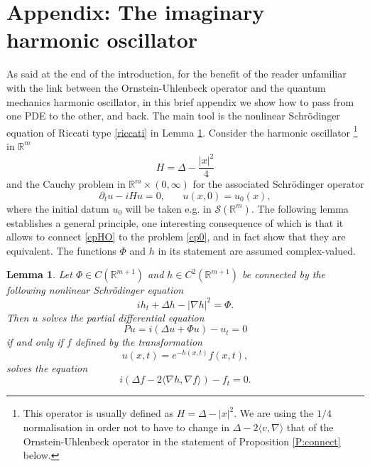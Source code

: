 \documentclass[11pt,a4paper]{amsart}
\def \R {\mathbb{R}}
\newcommand{\Rm}{\mathbb R^m}
\newcommand{\p}{\partial}
\numberwithin{equation}{section}
\newcommand{\sa}{\langle}
\newcommand{\da}{\rangle}
\newtheorem{lemma}[theorem]{Lemma}
\numberwithin{equation}{section}
\begin{document}
\section{Appendix: The imaginary harmonic oscillator}\label{S:app}

As said at the end of the introduction, for the benefit of the reader unfamiliar with the link between the Ornstein-Uhlenbeck operator and the quantum mechanics harmonic oscillator, in this brief appendix we show how to pass from one PDE to the other, and back. The main tool is the nonlinear Schr\"odinger equation of Riccati type \eqref{riccati} in Lemma \ref{L:ouho}. Consider the harmonic oscillator \footnote{This operator is usually defined as $H = \Delta - |x|^2$. We are using the $1/4$ normalisation in order not to have to change in $\Delta - 2 \sa v,\nabla\da$ that of the Ornstein-Uhlenbeck operator in the statement of Proposition \ref{P:connect} below.}  in $\Rm$
\begin{equation}\label{H}
H = \Delta - \frac{|x|^2}4
\end{equation}
and the Cauchy problem in $\Rm\times (0,\infty)$ for the associated Schr\"odinger operator
\begin{equation}\label{cpHO}
\p_t u - i H u = 0,\ \ \ \ \ \ \ \ u(x,0) = u_0(x),
\end{equation}
where the initial datum $u_0$ will be taken e.g. in $\mathscr S(\Rm)$. 
The following lemma establishes a general principle, one interesting consequence of which is that it allows to connect \eqref{cpHO} to the problem \eqref{cp0}, and in fact show that they are equivalent. The functions $\Phi$ and $h$ in its statement are assumed complex-valued.

\begin{lemma}\label{L:ouho}
Let $\Phi\in C(\R^{m+1})$ and $h\in C^2(\R^{m+1})$ be connected by the following  nonlinear Schr\"odinger equation
\begin{equation}\label{riccati}
i h_t + \Delta h - |\nabla h|^2  = \Phi.
\end{equation}
Then $u$ solves the partial differential equation
\begin{equation}\label{pdeho}
P u = i(\Delta u + \Phi u) - u_t = 0
\end{equation}
if and only if $f$ defined by the transformation
\begin{equation}\label{genexp}
u(x,t) = e^{-h(x,t)} f(x,t),
\end{equation} 
solves the equation
\begin{equation}\label{PDEou}
i(\Delta f - 2 \langle\nabla h,\nabla f\rangle) - f_t = 0.
\end{equation}
\end{lemma}
\end{document}
